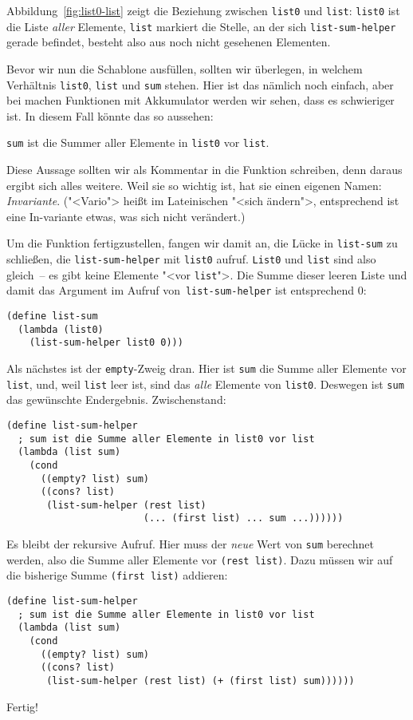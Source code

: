 Abbildung~\ref{fig:list0-list} zeigt die Beziehung zwischen
\lstinline{list0} und \lstinline{list}: \lstinline{list0} ist die
Liste \emph{aller} Elemente, \lstinline{list} markiert die Stelle, an
der sich \lstinline{list-sum-helper} gerade befindet, besteht also aus
noch nicht gesehenen Elementen.

Bevor wir nun die Schablone ausfüllen, sollten wir überlegen, in welchem Verhältnis
\lstinline{list0}, \lstinline{list} und \lstinline{sum} stehen.  Hier
ist das nämlich noch einfach, aber bei machen Funktionen mit
Akkumulator werden wir sehen, dass es schwieriger ist.  In diesem Fall
könnte das so aussehen:
%
\begin{center}
  \lstinline{sum} ist die Summer aller Elemente in \lstinline{list0} vor
  \lstinline{list}.
\end{center}
%
Diese Aussage sollten wir als Kommentar in die Funktion schreiben,
denn daraus ergibt sich alles weitere.  Weil sie so wichtig ist, hat
sie einen eigenen Namen: \textit{Invariante}.
("<Vario"> heißt im Lateinischen "<sich ändern">, entsprechend
ist eine In-variante etwas, was sich nicht verändert.)

Um die Funktion fertigzustellen, fangen wir damit an, die Lücke in
\lstinline{list-sum} zu schließen, die \lstinline{list-sum-helper} mit
\lstinline{list0} aufruf.  \lstinline{List0} und \lstinline{list} sind
also gleich~-- es gibt keine Elemente "<vor \lstinline{list}">.  Die
Summe dieser leeren Liste und damit das Argument im Aufruf
von \lstinline{list-sum-helper} ist entsprechend 0:
%
\begin{lstlisting}
(define list-sum
  (lambda (list0)
    (list-sum-helper list0 0)))
\end{lstlisting}
%
Als nächstes ist der \lstinline{empty}-Zweig dran.  Hier ist
\lstinline{sum} die Summe aller Elemente vor \lstinline{list}, und,
weil \lstinline{list} leer ist, sind das \emph{alle} Elemente von
\lstinline{list0}.  Deswegen ist \lstinline{sum} das gewünschte
Endergebnis.  Zwischenstand:
%
\begin{lstlisting}
(define list-sum-helper
  ; sum ist die Summe aller Elemente in list0 vor list
  (lambda (list sum)
    (cond
      ((empty? list) sum)
      ((cons? list)
       (list-sum-helper (rest list)
                        (... (first list) ... sum ...))))))
\end{lstlisting}
%
Es bleibt der rekursive Aufruf.  Hier muss der \emph{neue} Wert von
\lstinline{sum} berechnet werden, also die Summe aller Elemente vor
\lstinline{(rest list)}.  Dazu müssen wir auf die bisherige Summe
\lstinline{(first list)} addieren:
%
\begin{lstlisting}
(define list-sum-helper
  ; sum ist die Summe aller Elemente in list0 vor list
  (lambda (list sum)
    (cond
      ((empty? list) sum)
      ((cons? list)
       (list-sum-helper (rest list) (+ (first list) sum))))))
\end{lstlisting}
%
Fertig!

